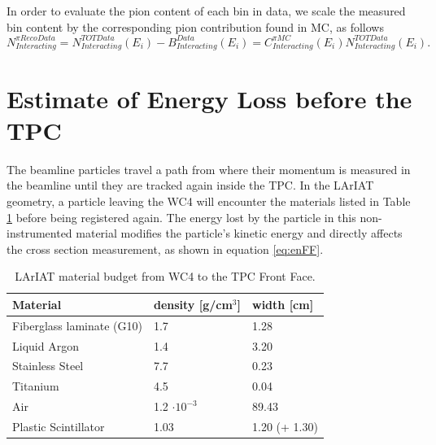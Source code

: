 In order to evaluate the pion content of each bin in data, we scale the measured bin content by the corresponding  pion contribution found in MC, as follows
\begin{equation}
N^{\pi Reco Data}_{Interacting} = N^{TOT Data}_{Interacting} (E_{i}) - B^{Data}_{Interacting} (E_i)  =  C^{\pi MC}_{Interacting} (E_{i}) N^{TOT Data}_{Interacting} (E_{i}).
\end{equation}


\section{Estimate of Energy Loss before the TPC}\label{ch:eloss}
The beamline particles travel a path from where their  momentum is measured in the beamline until they are tracked again inside the TPC. In the LArIAT geometry, a particle leaving the WC4 will encounter the materials listed in Table \ref{tab:budget} before being registered again. The energy lost by the particle in this non-instrumented material modifies the particle's kinetic energy and directly affects the cross section measurement, as shown in equation \ref{eq:enFF}.

\begin{table}[h!]
\centering
\begin{tabular}{|l|l|l|}
\hline
Material  & density {[}g/cm$^3${]} & width {[}cm{]}    \\ \hline
Fiberglass laminate (G10)      & 1.7                             & 1.28                              \\
Liquid Argon                           & 1.4                             & 3.20                             \\
Stainless Steel                        & 7.7                            & 0.23                             \\
Titanium                                  & 4.5                            & 0.04                             \\ 
Air                                            &  1.2 $\cdot10^{-3}$  & 89.43                              \\
Plastic Scintillator                    & 1.03                          & 1.20 (+ 1.30)                 \\ \hline
\end{tabular}
\caption{LArIAT material budget from WC4 to the TPC Front Face.}
\label{tab:budget}
\end{table}


